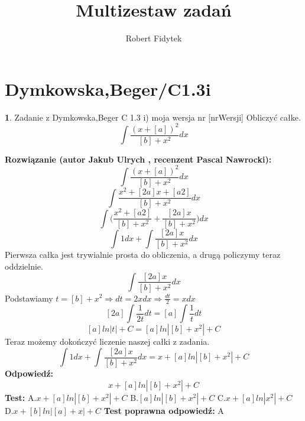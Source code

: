 \documentclass[12pt, a4paper]{article}
\title{Multizestaw zadań}
\author{Robert Fidytek}
\date{}
\theoremstyle{definition} %
\newtheorem{zad}{}
\newcommand{\kategoria}[1]{\section{#1}} %
\newcommand{\zadStart}[1]{\begin{zad}#1\newline} %
\newcommand{\zadStop}{\end{zad}}   %
\newcommand{\rozwStart}[2]{\noindent \textbf{Rozwiązanie (autor #1 , recenzent #2): }\newline} %
\newcommand{\rozwStop}{\newline}                                            %
\newcommand{\odpStart}{\noindent \textbf{Odpowiedź:}\newline}    %
\newcommand{\odpStop}{\newline}                                             %
\newcommand{\testStart}{\noindent \textbf{Test:}\newline} %
\newcommand{\testStop}{\newline} %
\newcommand{\kluczStart}{\noindent \textbf{Test poprawna odpowiedź:}\newline} %
\newcommand{\kluczStop}{\newline} %
\begin{document}
\maketitle


\kategoria{Dymkowska,Beger/C1.3i}
\zadStart{Zadanie z Dymkowska,Beger C 1.3 i) moja wersja nr [nrWersji]}
Obliczyć całke.$$\int\frac{(x+[a])^{2}}{[b]+x^{2}}dx$$
\zadStop
\rozwStart{Jakub Ulrych}{Pascal Nawrocki}
$$\int\frac{(x+[a])^{2}}{[b]+x^{2}}dx$$
$$\int\frac{x^{2}+[2a]x+[a2]}{[b]+x^{2}}dx$$
$$\int\bigg(\frac{x^{2}+[a2]}{[b]+x^{2}}+\frac{[2a]x}{[b]+x^{2}}\bigg)dx$$
$$\int1dx+\int\frac{[2a]x}{[b]+x^{2}}dx$$
Pierwsza całka jest trywialnie prosta do obliczenia, a drugą policzymy teraz oddzielnie.
$$\int\frac{[2a]x}{[b]+x^{2}}dx$$
Podstawiamy $t=[b]+x^{2}\Rightarrow dt=2xdx \Rightarrow \frac{dt}{2}=xdx$
$$[2a]\int\frac{1}{2t}dt=[a]\int\frac{1}{t}dt$$
$$[a]ln|t|+C=[a]ln|[b]+x^{2}|+C$$
Teraz możemy dokończyć liczenie naszej całki z zadania.
$$\int1dx+\int\frac{[2a]x}{[b]+x^{2}}dx=x+[a]ln|[b]+x^{2}|+C$$
\rozwStop
\odpStart
$$x+[a]ln|[b]+x^{2}|+C$$
\odpStop
\testStart
A.$x+[a]ln|[b]+x^{2}|+C$
B.$[a]ln|[b]+x^{2}|+C$
C.$x+[a]ln|x^{2}|+C$
D.$x+[b]ln|[a]+x|+C$
\testStop
\kluczStart
A
\kluczStop
\end{document}
